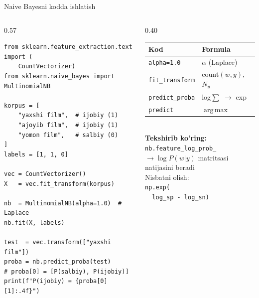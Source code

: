 \documentclass[aspectratio=169,11pt]{beamer}
\begin{document}
\begin{frame}[fragile]{Naive Bayesni kodda ishlatish}
  \begin{columns}[T]
    \begin{column}{0.57\textwidth}
\begin{lstlisting}
from sklearn.feature_extraction.text import (
    CountVectorizer)
from sklearn.naive_bayes import MultinomialNB

korpus = [
    "yaxshi film",  # ijobiy (1)
    "ajoyib film",  # ijobiy (1)
    "yomon film",   # salbiy (0)
]
labels = [1, 1, 0]

vec = CountVectorizer()
X   = vec.fit_transform(korpus)

nb  = MultinomialNB(alpha=1.0)  # Laplace
nb.fit(X, labels)

test  = vec.transform(["yaxshi film"])
proba = nb.predict_proba(test)
# proba[0] = [P(salbiy), P(ijobiy)]
print(f"P(ijobiy) = {proba[0][1]:.4f}")
\end{lstlisting}
    \end{column}
    \begin{column}{0.40\textwidth}
      \small
      \begin{tabular}{@{}ll@{}}
        \toprule
        Kod & Formula \\
        \midrule
        \texttt{alpha=1.0} & $\alpha$ (Laplace) \\
        \texttt{fit\_transform} & $\mathrm{count}(w,y)$, $N_y$ \\
        \texttt{predict\_proba} & log$\sum$ $\to$ exp\\
        \texttt{predict}        & $\operatorname{arg\,max}$ \\
        \bottomrule
      \end{tabular}
      \vspace{6pt}\\
      \small\textbf{Tekshirib ko'ring:}\\
      \texttt{nb.feature\_log\_prob\_}\\
      $\to\log P(w|y)$ matritsasi natijasini beradi\\[4pt]
      \textcolor{halfgray}{\footnotesize
        Nisbatni olish:\\
        \texttt{np.exp(}\\
        \texttt{~~log\_sp - log\_sn)}}
    \end{column}
  \end{columns}
\end{frame}
\end{document}

